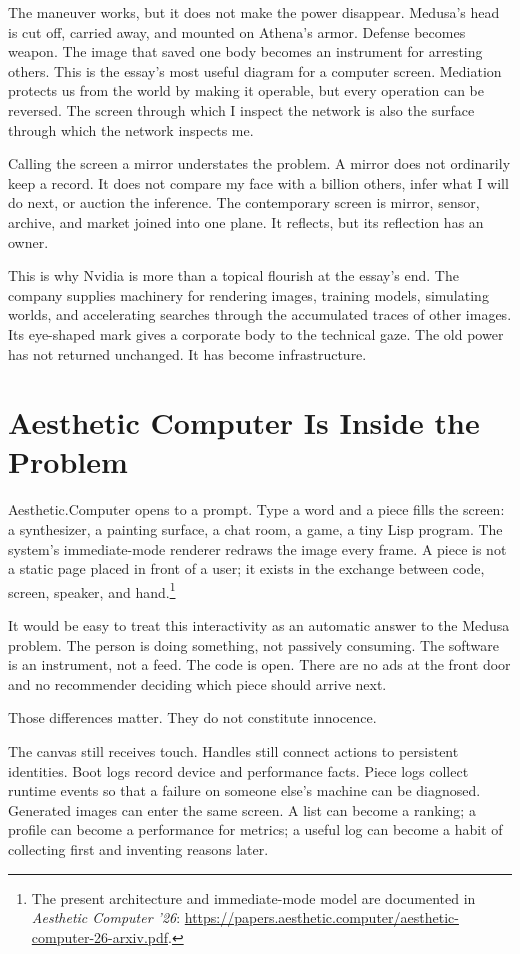 \documentclass[11pt,letterpaper]{article}
\newcommand{\ac}{Aesthetic\textcolor{acpink}{.}Computer}
\begin{document}
The maneuver works, but it does not make the power disappear. Medusa's head is
cut off, carried away, and mounted on Athena's armor. Defense becomes weapon.
The image that saved one body becomes an instrument for arresting others. This
is the essay's most useful diagram for a computer screen. Mediation protects us
from the world by making it operable, but every operation can be reversed. The
screen through which I inspect the network is also the surface through which the
network inspects me.

Calling the screen a mirror understates the problem. A mirror does not ordinarily
keep a record. It does not compare my face with a billion others, infer what I
will do next, or auction the inference. The contemporary screen is mirror,
sensor, archive, and market joined into one plane. It reflects, but its
reflection has an owner.

This is why Nvidia is more than a topical flourish at the essay's end. The
company supplies machinery for rendering images, training models, simulating
worlds, and accelerating searches through the accumulated traces of other
images. Its eye-shaped mark gives a corporate body to the technical gaze. The
old power has not returned unchanged. It has become infrastructure.

\section{Aesthetic Computer Is Inside the Problem}

\ac{} opens to a prompt. Type a word and a piece fills the screen: a synthesizer,
a painting surface, a chat room, a game, a tiny Lisp program. The system's
immediate-mode renderer redraws the image every frame. A piece is not a static
page placed in front of a user; it exists in the exchange between code, screen,
speaker, and hand.\footnote{The present architecture and immediate-mode model
are documented in \textit{Aesthetic Computer '26}:
\url{https://papers.aesthetic.computer/aesthetic-computer-26-arxiv.pdf}.}

It would be easy to treat this interactivity as an automatic answer to the
Medusa problem. The person is doing something, not passively consuming. The
software is an instrument, not a feed. The code is open. There are no ads at the
front door and no recommender deciding which piece should arrive next.

Those differences matter. They do not constitute innocence.

The canvas still receives touch. Handles still connect actions to persistent
identities. Boot logs record device and performance facts. Piece logs collect
runtime events so that a failure on someone else's machine can be diagnosed.
Generated images can enter the same screen. A list can become a ranking; a
profile can become a performance for metrics; a useful log can become a habit of
collecting first and inventing reasons later.
\end{document}
